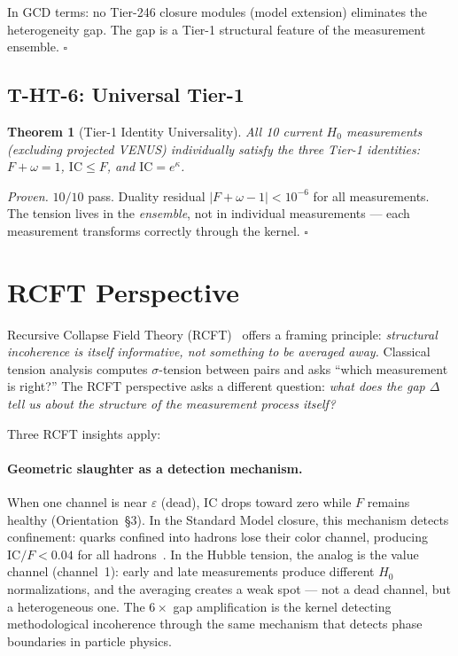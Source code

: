 \documentclass[
  aps,
  prd,
  twocolumn,
  superscriptaddress,
  nofootinbib,
  floatfix
]{revtex4-2}
\newtheorem{theorem}{Theorem}
\newcommand{\eps}{\varepsilon}
\newcommand{\IC}{\mathrm{IC}}
\newcommand{\hetgap}{\Delta}
\newcommand{\Fid}{F}
\newcommand{\Drft}{\omega}
\newcommand{\Logint}{\kappa}
\begin{document}
In GCD terms: no Tier-246 closure modules (model extension) eliminates
the heterogeneity gap.
The gap is a Tier-1 structural feature of the measurement ensemble.
\hfill$\square$

\subsection{T-HT-6: Universal Tier-1}

\begin{theorem}[Tier-1 Identity Universality]\label{thm:T6}
All 10 current $H_0$ measurements (excluding projected VENUS)
individually satisfy the three Tier-1 identities:
$\Fid + \Drft = 1$, $\IC \leq \Fid$, and $\IC = e^{\Logint}$.
\end{theorem}

\noindent\textit{Proven.}
$10/10$ pass. Duality residual $|\Fid + \Drft - 1| < 10^{-6}$
for all measurements.
The tension lives in the \emph{ensemble}, not in individual
measurements --- each measurement transforms correctly through
the kernel.  \hfill$\square$

\section{RCFT Perspective}\label{sec:rcft}

Recursive Collapse Field Theory (RCFT)~\cite{paulus2025rcft,paulus2025ucd}
offers a framing principle: \emph{structural incoherence is itself
informative, not something to be averaged away.}
Classical tension analysis computes $\sigma$-tension between pairs
and asks ``which measurement is right?''
The RCFT perspective asks a different question: \emph{what does
the gap $\hetgap$ tell us about the structure of the measurement
process itself?}

Three RCFT insights apply:

\paragraph{Geometric slaughter as a detection mechanism.}
When one channel is near $\eps$ (dead), $\IC$ drops toward zero
while $\Fid$ remains healthy (Orientation~\S3).
In the Standard Model closure, this mechanism detects confinement:
quarks confined into hadrons lose their color channel, producing
$\IC/\Fid < 0.04$ for all hadrons~\cite{paulus2025physicscoherence}.
In the Hubble tension, the analog is the value channel (channel~1):
early and late measurements produce different $H_0$ normalizations,
and the averaging creates a weak spot --- not a dead channel, but
a heterogeneous one.
The $6\times$ gap amplification is the kernel detecting
methodological incoherence through the same mechanism that
detects phase boundaries in particle physics.
\end{document}
